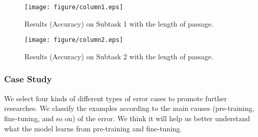 \documentclass[11pt,a4paper]{article}
\begin{document}
\begin{figure}[h]
    \centering
    \texttt{[image: figure/column1.eps]}
    \caption{\label{font-table}Results (Accuracy) on  Subtask 1 with the length of passage.}
    \label{fig:result1-length}
\end{figure}

\begin{figure}[h]
    \centering
    \texttt{[image: figure/column2.eps]}
    \caption{\label{font-table}Results (Accuracy) on  Subtask 2 with the length of passage.}
    \label{fig:result2-length}
\end{figure}

\subsubsection{Case Study}
We select four kinds of different types of error cases to promote further researches.
We classify the examples according to the main causes (pre-training, fine-tuning, and so on) of the error.
We think it will help us better understand what the model learns from pre-training and fine-tuning.
\end{document}
